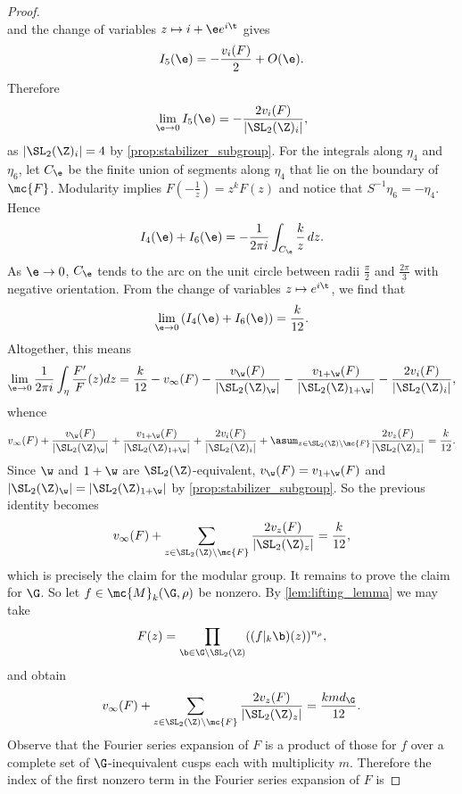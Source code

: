 \documentclass[12pt]{article}
\begin{document}
\begin{proof}
\[        \]
        and the change of variables \(z \mapsto i+\e e^{i\t}\) gives
        \[
          I_{5}(\e) = -\frac{v_{i}(F)}{2}+O(\e).
        \]
        Therefore
        \[
          \lim_{\e \to 0}I_{5}(\e) = -\frac{2v_{i}(F)}{|\SL_{2}(\Z)_{i}|},
        \]
        as \(|\SL_{2}(\Z)_{i}| = 4\) by \cref{prop:stabilizer_subgroup}. For the integrals along \(\eta_{4}\) and \(\eta_{6}\), let \(C_{\e}\) be the finite union of segments along \(\eta_{4}\) that lie on the boundary of \(\mc{F}\). Modularity implies \(F\left(-\frac{1}{z}\right) = z^{k}F(z)\) and notice that \(S^{-1}\eta_{6} = -\eta_{4}\). Hence
        \[
          I_{4}(\e)+I_{6}(\e) = -\frac{1}{2\pi i}\int_{C_{\e}}\frac{k}{z}\,dz.
        \]
        As \(\e \to 0\), \(C_{\e}\) tends to the arc on the unit circle between radii \(\frac{\pi}{2}\) and \(\frac{2\pi}{3}\) with negative orientation. From the change of variables \(z \mapsto e^{i\t}\), we find that
        \[
          \lim_{\e \to 0}\left(I_{4}(\e)+I_{6}(\e)\right) = \frac{k}{12}.
        \]
        Altogether, this means
        \begin{equation}\label{equ:valence_formula_9}
          \lim_{\e \to 0}\frac{1}{2\pi i}\int_{\eta}\frac{F'}{F}(z)dz = \frac{k}{12}-v_{\infty}(F)-\frac{v_{\w}(F)}{|\SL_{2}(\Z)_{\w}|}-\frac{v_{1+\w}(F)}{|\SL_{2}(\Z)_{1+\w}|}-\frac{2v_{i}(F)}{|\SL_{2}(\Z)_{i}|},
        \end{equation}
        whence
        \[
          v_{\infty}(F)+\frac{v_{\w}(F)}{|\SL_{2}(\Z)_{\w}|}+\frac{v_{1+\w}(F)}{|\SL_{2}(\Z)_{1+\w}|}+\frac{2v_{i}(F)}{|\SL_{2}(\Z)_{i}|}+\asum_{z \in \SL_{2}(\Z)\backslash\mc{F}}\frac{2v_{z}(F)}{|\SL_{2}(\Z)_{z}|} = \frac{k}{12}.
        \]
        Since \(\w\) and \(1+\w\) are \(\SL_{2}(\Z)\)-equivalent, \(v_{\w}(F) = v_{1+\w}(F)\) and \(|\SL_{2}(\Z)_{\w}| = |\SL_{2}(\Z)_{1+\w}|\) by \cref{prop:stabilizer_subgroup}. So the previous identity becomes
        \[
          v_{\infty}(F)+\sum_{z \in \SL_{2}(\Z)\backslash\mc{F}}\frac{2v_{z}(F)}{|\SL_{2}(\Z)_{z}|} = \frac{k}{12},
        \]
        which is precisely the claim for the modular group. It remains to prove the claim for \(\G\). So let \(f \in \mc{M}_{k}(\G,\rho)\) be nonzero. By \cref{lem:lifting_lemma} we may take
        \[
          F(z) = \prod_{\b \in \G\backslash\SL_{2}(\Z)}((f|_{k}\b)(z))^{n_{\rho}},
        \]
        and obtain
        \[
          v_{\infty}(F)+\sum_{z \in \SL_{2}(\Z)\backslash\mc{F}}\frac{2v_{z}(F)}{|\SL_{2}(\Z)_{z}|} = \frac{kmd_{\G}}{12}.
        \]
        Observe that the Fourier series expansion of \(F\) is a product of those for \(f\) over a complete set of \(\G\)-inequivalent cusps each with multiplicity \(m\). Therefore the index of the first nonzero term in the Fourier series expansion of \(F\) is

\end{proof}
\end{document}
